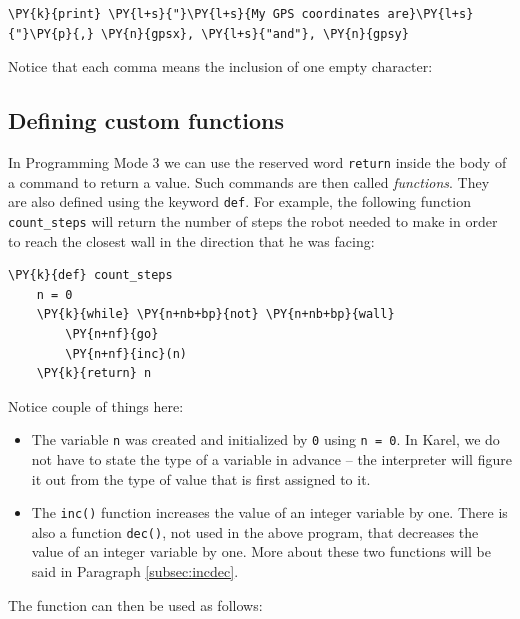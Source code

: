 \begin{bbox}
\begin{Verbatim}[commandchars=\\\{\}]
\PY{k}{print} \PY{l+s}{"}\PY{l+s}{My GPS coordinates are}\PY{l+s}{"}\PY{p}{,} \PY{n}{gpsx}, \PY{l+s}{"and"}, \PY{n}{gpsy}
\end{Verbatim}
\end{bbox}
\vspace{6mm}

\noindent
Notice that each comma means the inclusion of one empty character:


\subsection[\ \ Defining custom functions]{Defining custom functions}

In Programming Mode 3 we can use the reserved word {\tt return} inside the body of
a command to return a value. Such commands are then called {\em functions}. 
They are also defined using the keyword {\tt def}. For example, the following function
{\tt count\_steps} will return the number of steps the robot needed to 
make in order to reach the closest wall in the direction that he was facing:\\

\begin{bbox}
\begin{Verbatim}[commandchars=\\\{\}]
\PY{k}{def} count_steps
    n = 0
    \PY{k}{while} \PY{n+nb+bp}{not} \PY{n+nb+bp}{wall}
        \PY{n+nf}{go}
        \PY{n+nf}{inc}(n)
    \PY{k}{return} n
\end{Verbatim}
\end{bbox}
\vspace{6mm}

\noindent
Notice couple of things here:
\begin{itemize}
\item The variable {\tt n} was created and initialized by {\tt 0} using {\tt n = 0}. In
      Karel, we do not have to state the type of a variable in advance -- the interpreter 
      will figure it out from the type of value that is first assigned to it.  
\item The {\tt inc()} function increases the value of an integer variable by one. 
      There is also a function {\tt dec()}, not used in the above program, that decreases 
      the value of an integer variable by one. More about these two functions will be said 
      in Paragraph \ref{subsec:incdec}.
\end{itemize}
The function can then be used as follows:\\

